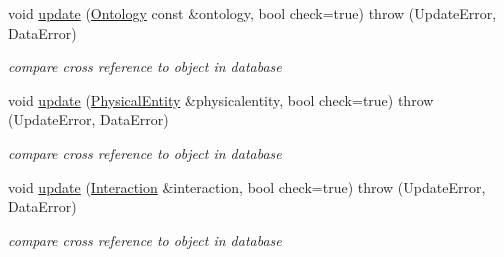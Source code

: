 \begin{DoxyCompactItemize}
void \hyperlink{classunisys_1_1Updater_af0462b05f3161a4180b6e5b616e6708b}{update} (\hyperlink{classunisys_1_1Ontology}{Ontology} const \&ontology, bool check=true)  throw (\-Update\-Error, Data\-Error)
\begin{DoxyCompactList}\small\item\em compare cross reference to object in database \end{DoxyCompactList}\item 
void \hyperlink{classunisys_1_1Updater_a1ff3e10dde0a8f9355e198b390930162}{update} (\hyperlink{classunisys_1_1PhysicalEntity}{Physical\-Entity} \&physicalentity, bool check=true)  throw (\-Update\-Error, Data\-Error)
\begin{DoxyCompactList}\small\item\em compare cross reference to object in database \end{DoxyCompactList}\item 
void \hyperlink{classunisys_1_1Updater_a1c3139e122339e0d734de0b7a3142059}{update} (\hyperlink{classunisys_1_1Interaction}{Interaction} \&interaction, bool check=true)  throw (\-Update\-Error, Data\-Error)
\begin{DoxyCompactList}\small\item\em compare cross reference to object in database \end{DoxyCompactList}\end{DoxyCompactItemize}
